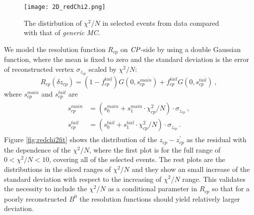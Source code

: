 \begin{figure}[htpb]
	\centering
	\texttt{[image: 2D\_redChi2.png]}
	\caption{The distirbution of $\chi^2/N$ in selected events from data compared with that of \textit{generic MC}.}
	\label{fig:redchi2}
\end{figure}

We model the resolution function $R_{cp}$ on $\it{CP}$-side by using a double Gaussian function, where the mean is fixed to zero and the standard deviation is the error of reconstructed vertex $\sigma_{z_{cp}}$ scaled by $\chi^2/N$:
\begin{equation}\label{eq:Rcp}
R_{cp}(\delta z_{cp}) = (1-f_{cp}^{tail})G(0,s_{cp}^{main})+
f_{cp}^{tail}G(0,s_{cp}^{tail})~,
\end{equation}
where $s_{cp}^{main}$ and $s_{cp}^{tail}$ are
\begin{eqnarray}\label{eq:scp_mt}
\begin{split}
s_{cp}^{main}&=(s_0^{main} + s_1^{main}\cdot \chi^2_{cp}/N )\cdot \sigma_{z_{cp}}~,\\
s_{cp}^{tail}&=(s_0^{tail} + s_1^{tail}\cdot \chi^2_{cp}/N )\cdot \sigma_{z_{cp}}~.
\end{split}
\end{eqnarray} 
Figure \ref{fig:redchi2fit} shows the distribution of the $z_{cp}-z_{cp}^{'}$ as the residual with the dependence of the $\chi^2/N$, where the first plot is for the full range of  $0<\chi^2/N<10$, covering all of the selected events. The rest plots are the distributions in the sliced ranges of $\chi^2/N$ and they show an small increase of the standard deviation with respect to the increasing of $\chi^2/N$ range. This validates the necessity to include the $\chi^2/N$ as a conditional parameter in $R_{cp}$ so that for a poorly reconstructed $B^0$ the resolution functions should yield relatively larger deviation.

